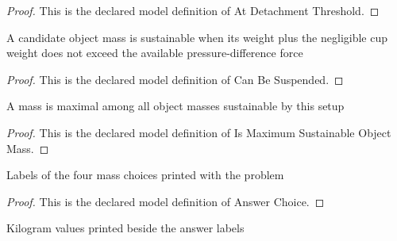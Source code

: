 \begin{proof}
  This is the declared model definition of At Detachment Threshold.
\end{proof}
\begin{definition}
  \label{def:physics:phyx-mini-0720:phyxminiproblems-problemphyxmini0720-canbesuspended}
  A candidate object mass is sustainable when its weight plus the negligible cup weight does not exceed the available pressure-difference force
\end{definition}
\begin{proof}
  This is the declared model definition of Can Be Suspended.
\end{proof}
\begin{definition}
  \label{def:physics:phyx-mini-0720:phyxminiproblems-problemphyxmini0720-ismaximumsustainableobjectmass}
  A mass is maximal among all object masses sustainable by this setup
\end{definition}
\begin{proof}
  This is the declared model definition of Is Maximum Sustainable Object Mass.
\end{proof}
\begin{definition}
  \label{def:physics:phyx-mini-0720:phyxminiproblems-problemphyxmini0720-answerchoice}
  Labels of the four mass choices printed with the problem
\end{definition}
\begin{proof}
  This is the declared model definition of Answer Choice.
\end{proof}
\begin{definition}
  \label{def:physics:phyx-mini-0720:phyxminiproblems-problemphyxmini0720-displayedmassinkilograms}
  Kilogram values printed beside the answer labels
\end{definition}
